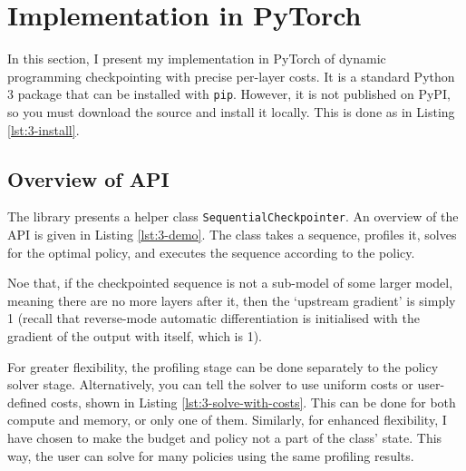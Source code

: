 \section{Implementation in PyTorch} \label{sec:3-pytorch-impl}
In this section, I present my implementation in PyTorch of dynamic programming checkpointing with precise per-layer costs.
It is a standard Python 3 package that can be installed with \texttt{pip}.
However, it is not published on PyPI, so you must download the source and install it locally.
This is done as in Listing \ref{lst:3-install}.


\subsection{Overview of API}
The library presents a helper class \texttt{SequentialCheckpointer}.
An overview of the API is given in Listing \ref{lst:3-demo}.
The class takes a sequence, profiles it, solves for the optimal policy, and executes the sequence according to the policy.


Noe that, if the checkpointed sequence is not a sub-model of some larger model, meaning there are no more layers after it, then the `upstream gradient' is simply 1 (recall that reverse-mode automatic differentiation is initialised with the gradient of the output with itself, which is 1).

For greater flexibility, the profiling stage can be done separately to the policy solver stage.
Alternatively, you can tell the solver to use uniform costs or user-defined costs, shown in Listing \ref{lst:3-solve-with-costs}.
This can be done for both compute and memory, or only one of them.
Similarly, for enhanced flexibility, I have chosen to make the budget and policy not a part of the class' state.
This way, the user can solve for many policies using the same profiling results.


